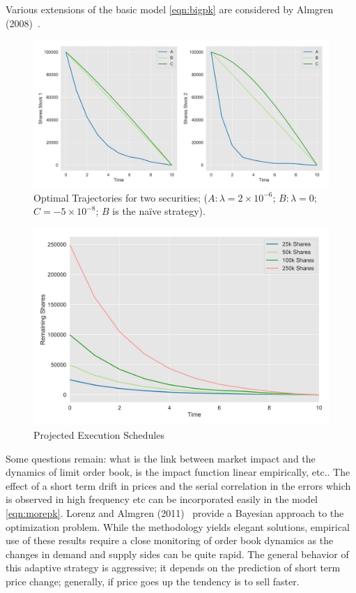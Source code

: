 Various extensions of the basic model \eqref{eqn:bigpk} are considered by Almgren (2008)~\cite{alm2008}.
	
	\begin{figure}[!ht]
	\centering
	\includegraphics[width=\textwidth]{chapters/chapter_exec_models/figures/opt_traj1.png}
	\caption{Optimal Trajectories for two securities; ($A: \lambda= 2 \times 10^{-6}$; $B: \lambda=0$; $C= -5 \times 10^{-8}$; $B$ is the na\"ive strategy). \label{fig:7first}}
	\end{figure}
	\begin{figure}[!ht] 
	\centering
	\includegraphics[width=\textwidth]{chapters/chapter_exec_models/figures/opt_traj2.png}
	\caption{Projected Execution Schedules \label{fig:7second}}
	\end{figure}
 

Some questions remain: what is the link between market impact and the dynamics of limit order book, is the impact function linear empirically, etc.. The effect of a short term drift in prices and the serial correlation in the errors which is observed in high frequency etc can be incorporated easily in the model \eqref{eqn:morepk}. Lorenz and Almgren (2011)~\cite{lovenz2011} provide a Bayesian approach to the optimization problem. While the methodology yields elegant solutions, empirical use of these results require a close monitoring of order book dynamics as the changes in demand and supply sides can be quite rapid. The general behavior of this adaptive strategy is aggressive; it depends on the prediction of short term price change; generally, if price goes up the tendency is to sell faster. 


